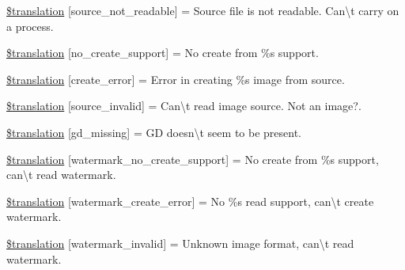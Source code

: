 \begin{DoxyCompactItemize}
\item 
\hyperlink{class_8upload_8xx___x_x_8php_a922967ca2df0efdd455261142d8e5715}{\$translation} \mbox{[}\textquotesingle{}source\+\_\+not\+\_\+readable\textquotesingle{}\mbox{]} = \textquotesingle{}Source file is not readable. Can\textbackslash{}\textquotesingle{}t carry on a process.\textquotesingle{}
\item 
\hyperlink{class_8upload_8xx___x_x_8php_a346dfd1ade29f583dd20d345c436859f}{\$translation} \mbox{[}\textquotesingle{}no\+\_\+create\+\_\+support\textquotesingle{}\mbox{]} = \textquotesingle{}No create from \%s support.\textquotesingle{}
\item 
\hyperlink{class_8upload_8xx___x_x_8php_a53013ce9255c4e1849098ddd9fdb2b3f}{\$translation} \mbox{[}\textquotesingle{}create\+\_\+error\textquotesingle{}\mbox{]} = \textquotesingle{}Error in creating \%s image from source.\textquotesingle{}
\item 
\hyperlink{class_8upload_8xx___x_x_8php_a6ab0a660b457eaf2d3434b225449fdd6}{\$translation} \mbox{[}\textquotesingle{}source\+\_\+invalid\textquotesingle{}\mbox{]} = \textquotesingle{}Can\textbackslash{}\textquotesingle{}t read image source. Not an image?.\textquotesingle{}
\item 
\hyperlink{class_8upload_8xx___x_x_8php_a7f3dfcc0db4bbc0f2e7210c439798e56}{\$translation} \mbox{[}\textquotesingle{}gd\+\_\+missing\textquotesingle{}\mbox{]} = \textquotesingle{}G\+D doesn\textbackslash{}\textquotesingle{}t seem to be present.\textquotesingle{}
\item 
\hyperlink{class_8upload_8xx___x_x_8php_a82d5853430ab72dc1f9799ec36144cc6}{\$translation} \mbox{[}\textquotesingle{}watermark\+\_\+no\+\_\+create\+\_\+support\textquotesingle{}\mbox{]} = \textquotesingle{}No create from \%s support, can\textbackslash{}\textquotesingle{}t read watermark.\textquotesingle{}
\item 
\hyperlink{class_8upload_8xx___x_x_8php_aabca0b65dadbc6184415c16375f284ca}{\$translation} \mbox{[}\textquotesingle{}watermark\+\_\+create\+\_\+error\textquotesingle{}\mbox{]} = \textquotesingle{}No \%s read support, can\textbackslash{}\textquotesingle{}t create watermark.\textquotesingle{}
\item 
\hyperlink{class_8upload_8xx___x_x_8php_ac336e7a5701e47ba4a05e9e498a3cc44}{\$translation} \mbox{[}\textquotesingle{}watermark\+\_\+invalid\textquotesingle{}\mbox{]} = \textquotesingle{}Unknown image format, can\textbackslash{}\textquotesingle{}t read watermark.\textquotesingle{}
\item 

\end{DoxyCompactItemize}

